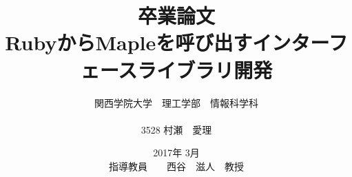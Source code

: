 \documentclass[12pt,a4paper]{jsarticle}
\begin{document}
\title{卒業論文\\
\vspace{4cm} RubyからMapleを呼び出すインターフェースライブラリ開発}
\author{ 関西学院大学　理工学部　情報科学科\\\\ 3528    村瀬　愛理}
\date{\vspace{3cm} 2017年  3月\\
\vspace{3cm} 指導教員　　西谷　滋人　教授}
\maketitle
\setcounter{tocdepth}{4}
\tableofcontents









\end{document}
